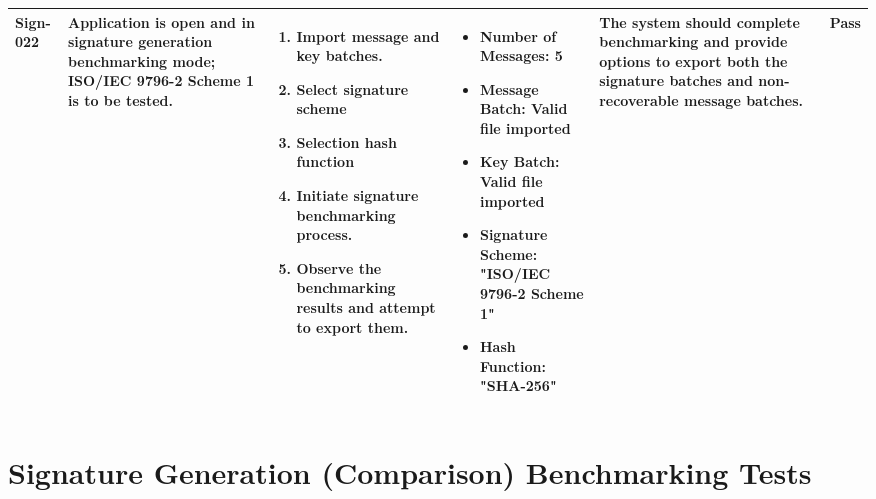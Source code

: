 \documentclass[]{final_report}
\theoremstyle{definition}
\begin{document}
\begin{longtable}{|l|p{2.5cm}|p{2.8cm}|p{3cm}|p{2cm}|p{1.5cm}|}
  Sign-022 & Application is open and in signature generation benchmarking mode; ISO/IEC 9796-2 Scheme 1 is to be tested. &
  \begin{enumerate}
    \item Import message and key batches.
    \item Select signature scheme 
    \item Selection hash function
    \item Initiate signature benchmarking process.
    \item Observe the benchmarking results and attempt to export them.
  \end{enumerate} & 
  \begin{itemize}
    \item Number of Messages: 5
    \item Message Batch: Valid file imported
    \item Key Batch: Valid file imported
    \item Signature Scheme: "ISO/IEC 9796-2 Scheme 1"
    \item Hash Function: "SHA-256"
  \end{itemize} &
  The system should complete benchmarking and provide options to export both the signature batches and non-recoverable message batches. & Pass \\
  \hline
 
\end{longtable}

  
\section*{Signature Generation (Comparison) Benchmarking Tests} 
\end{document}
